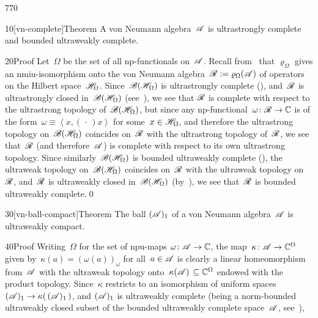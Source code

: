 \begin{parsec}{770}%
\begin{point}{10}[vn-complete]{Theorem}%
A von Neumann algebra~$\mathscr{A}$ is ultrastrongly complete
and bounded ultraweakly complete.
\begin{point}{20}{Proof}%
Let~$\Omega$ be the set of all np-functionals
on~$\mathscr{A}$.
Recall from~
that $\varrho_\Omega$
gives an nmiu-isomorphism
onto the 
von Neumann algebra~$\mathscr{R}:=\varrho_\Omega(\mathscr{A})$ of operators
on the Hilbert space~$\mathscr{H}_\Omega$.
Since~$\mathscr{B}(\mathscr{H}_\Omega)$ is ultrastrongly complete
(),
and~$\mathscr{R}$ is  ultrastrongly closed in~$\mathscr{B}(\mathscr{H}_\Omega)$
(see~),
we see that $\mathscr{R}$
is complete with respect to the ultrastrong
topology of~$\mathscr{B}(\mathscr{H}_\Omega)$,
but since any np-functional~$\omega\colon \mathscr{R}\to\mathbb{C}$
is of the form~$\omega\equiv \left<x,(\,\cdot\,)x\right>$
for some~$x\in\mathscr{H}_\Omega$,
and therefore  the ultrastrong topology on~$\mathscr{B}(\mathscr{H}_\Omega)$
coincides on~$\mathscr{R}$ with the ultrastrong topology of~$\mathscr{R}$,
we see that~$\mathscr{R}$ (and therefore~$\mathscr{A}$)
is complete with respect to its own ultrastrong topology.
Since similarly~$\mathscr{B}(\mathscr{H}_\Omega)$
is bounded ultraweakly complete (),
the ultraweak topology on~$\mathscr{B}(\mathscr{H}_\Omega)$
coincides on~$\mathscr{R}$ with the ultraweak topology on~$\mathscr{R}$,
and~$\mathscr{R}$ is ultraweakly closed
in~$\mathscr{B}(\mathscr{H}_\Omega)$
(by~),
we see that~$\mathscr{R}$ is bounded ultraweakly complete.\qed
\end{point}
\end{point}
\begin{point}{30}[vn-ball-compact]{Theorem}%
The ball $(\mathscr{A})_1$
of a von Neumann algebra~$\mathscr{A}$ is ultraweakly compact.
\begin{point}{40}{Proof}%
Writing~$\Omega$ for
the set of npu-maps $\omega\colon \mathscr{A}\to\mathbb{C}$,
the map~$\kappa\colon \mathscr{A}\to \mathbb{C}^\Omega$
given by~$\kappa(a)=(\omega(a))_\omega$ for all~$a\in\mathscr{A}$
is clearly a linear homeomorphism from~$\mathscr{A}$ with the  ultraweak topology 
onto~$\kappa(\mathscr{A})\,\subseteq \mathbb{C}^\Omega$ endowed
with the product topology.
Since~$\kappa$ restricts
to an isomorphism of uniform spaces
$(\mathscr{A})_1\to \kappa(\,(\mathscr{A})_1\,)$,
and $(\mathscr{A})_1$ is ultraweakly complete 
(being a norm-bounded ultraweakly closed
subset of the bounded ultraweakly complete space~$\mathscr{A}$,
see~),

\end{point}
\end{point}
\end{parsec}
